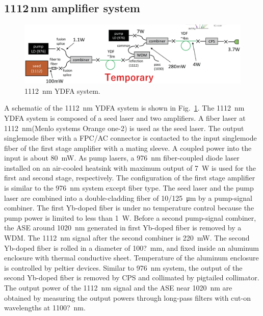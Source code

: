 \documentclass{osa-article}
\begin{document}
\subsection{1112\,nm amplifier system}

\begin{figure}[h!]
  \centering\includegraphics[width=\linewidth]{./Figure/1112nmYDFASystem_Temp.eps}
  \caption{\SI{1112}{\nm} YDFA system.}
  \label{fig:1112YDFASystem}
\end{figure}

A schematic of the \SI{1112}{\nm} YDFA system is shown in Fig.~\ref{fig:1112YDFASystem}.
The \SI{1112}{\nm} YDFA system is composed of a seed laser and two amplifiers.
A fiber laser at \SI{1112}{\nm}(Menlo systems Orange one-2) is used as the seed laser.
The output singlemode fiber with a FPC/AC connector is contacted to the input singlemode fiber of the first stage amplifier with a mating sleeve.
A coupled power into the input is about \SI{80}{\mW}.
As pump lasers, a \SI{976}{\nm} fiber-coupled diode laser installed on an air-cooled heatsink with maximum output of \SI{7}{\W} is used for the first and second stage, respectively.
The configuration of the first stage amplifier is similar to the \SI{976}{\nm} system except fiber type.
The seed laser and the pump laser are combined into a double-cladding fiber of \SI{10/125}{\um} by a pump-signal combiner.
The first Yb-doped fiber is under no temperature control because the pump power is limited to less than \SI{1}{\W}.
Before a second pump-signal combiner, the ASE around \SI{1020}{\nm} generated in first Yb-doped fiber is removed by a WDM.
The \SI{1112}{\nm} signal after the second combiner is \SI{220}{\mW}.
The second Yb-doped fiber is rolled in a diameter of \SI{100?}{\mm}, and fixed inside an aluminum enclosure with thermal conductive sheet.
Temperature of the aluminum enclosure is controlled by peltier devices.
Similar to \SI{976}{\nm} system, the output of the second Yb-doped fiber is removed by CPS and collimated by pigtailed collimator.
The output power of the \SI{1112}{\nm} signal and the ASE near \SI{1020}{\nm} are obtained by measuring the output powers through long-pass filters with cut-on wavelengths at \SI{1100?}{\nm}.
\end{document}
